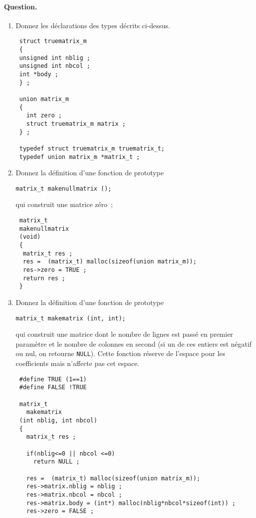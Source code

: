 \paragraph{Question.}
\begin{enumerate}
\item Donnez les d\'eclarations des types d\'ecrits ci-dessus.
\ifcorrection
\begin{correction}
\begin{verbatim}
 struct truematrix_m
 {
 unsigned int nblig ;
 unsigned int nbcol ;
 int *body ;
 } ;

 union matrix_m 
 {
   int zero ;
   struct truematrix_m matrix ;
 } ;

 typedef struct truematrix_m truematrix_t;
 typedef union matrix_m *matrix_t ;
\end{verbatim}
\end{correction}
\fi
\item Donnez la d\'efinition d'une fonction de prototype
\begin{verbatim}
matrix_t makenullmatrix ();
\end{verbatim}
qui construit une matrice z\'ero~;
\ifcorrection
\begin{correction}
\begin{verbatim}
 matrix_t
 makenullmatrix
 (void)
 {
  matrix_t res ;
  res =  (matrix_t) malloc(sizeof(union matrix_m)); 
  res->zero = TRUE ;
  return res ;
 }
\end{verbatim}
\end{correction}
\fi
\item Donnez la d\'efinition d'une fonction de prototype
\begin{verbatim}
matrix_t makematrix (int, int);
\end{verbatim}
  qui construit une matrice dont le nombre de lignes est pass\'e en
  premier param\`etre et le nombre de colonnes en second (si un de ces
  entiers est n\'egatif ou nul, on retourne \verb+NULL+).  Cette
  fonction r\'eserve de l'espace pour les coefficients mais n'affecte
  pas cet espace.
\ifcorrection
\begin{correction}
\begin{verbatim}
 #define TRUE (1==1)
 #define FALSE !TRUE

 matrix_t 
   makematrix
 (int nblig, int nbcol)
 {
   matrix_t res ;
 
   if(nblig<=0 || nbcol <=0)
     return NULL ;
   
   res =  (matrix_t) malloc(sizeof(union matrix_m)); 
   res->matrix.nblig = nblig ;
   res->matrix.nbcol = nbcol ;
   res->matrix.body = (int*) malloc(nblig*nbcol*sizeof(int)) ;
   res->zero = FALSE ;
   

\end{verbatim}
\end{correction}
\end{enumerate}
